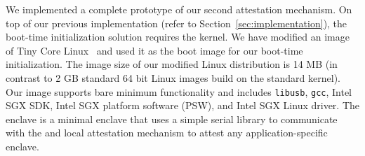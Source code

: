  We implemented a complete prototype of our second attestation mechanism. On top of our previous \name implementation (refer to Section~\ref{sec:implementation}), the boot-time initialization solution requires the \name kernel. We have modified an image of Tiny Core Linux~\cite{tinyCore} and used it as the boot image for our boot-time initialization. The image size of our modified Linux distribution is 14 MB (in contrast to 2 GB standard 64 bit Linux images build on the standard kernel). Our image supports bare minimum functionality and includes \texttt{libusb}, \texttt{gcc}, Intel SGX SDK, Intel SGX platform software (PSW), and Intel SGX Linux driver. The \name enclave is a minimal enclave that uses a simple serial library to communicate with the \device and local attestation mechanism to attest any application-specific enclave.
